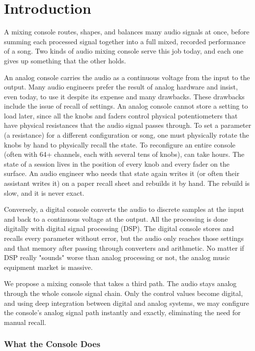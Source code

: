 \documentclass[11pt, letterpaper,titlepage]{article}
\begin{document}
\newpage


\section{Introduction}
\label{sec:intro}

A mixing console routes, shapes, and balances many audio signals at once, before summing each processed signal together into a full mixed, recorded performance of a song. Two kinds of audio mixing console serve this job today, and each one gives up something that the other holds.

An analog console carries the audio as a continuous voltage from the input to
the output. Many audio engineers prefer the result of analog hardware and insist, even today, to use it despite its expense and many drawbacks. These drawbacks include the issue of recall of settings. An analog console cannot store a
setting to load later, since all the knobs and faders control physical potentiometers that have physical resistances that the audio signal passes through. To set a parameter (a resistance) for a different configuration or song, one must physically rotate the knobs by hand to physically recall the state. To reconfigure an entire console (often with 64+ channels, each with several tens of knobs), can take hours. The state of a session lives in the position of every knob and every fader on the surface. An audio engineer who needs that state again writes it (or often their assistant writes it) on a paper recall sheet and rebuilds it by hand. The rebuild is slow, and it is never exact.

Conversely, a digital console converts the audio to discrete samples at the input and back to a continuous
voltage at the output. All the processing is done digitally with digital signal processing (DSP). The digital console stores and recalls every parameter without error, but the
audio only reaches those settings and that memory after passing through converters and arithmetic. No matter if DSP really "sounds" worse than analog processing or not, the analog music equipment market is massive.

We propose a mixing console that takes a third path. The audio stays analog through the whole console signal chain. Only the control values become digital, and using deep integration between digital and analog systems, we may configure the console's analog signal path instantly and exactly, eliminating the need for manual recall.

\subsubsection*{What the Console Does}
\end{document}
